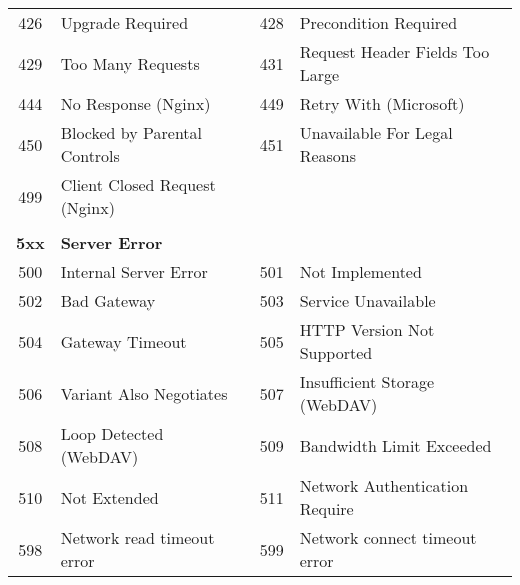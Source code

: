 \begin{longtable}[\textwidth]{|c|l|c|l|}
	426 & Upgrade Required & 428 & Precondition Required \\
	429 & Too Many Requests & 431 & Request Header Fields Too Large \\
	444 & No Response (Nginx) & 449 & Retry With (Microsoft) \\
	450 & Blocked by Parental Controls & 451 & Unavailable For Legal Reasons \\
	499 & Client Closed Request (Nginx) & & \\
	& & & \\
	\textbf{5xx} & \textbf{Server Error} & & \\
	500 & Internal Server Error & 501 & Not Implemented \\
	502 & Bad Gateway & 503 & Service Unavailable \\
	504 & Gateway Timeout & 505 & HTTP Version Not Supported \\
	506 & Variant Also Negotiates & 507 & Insufficient Storage (WebDAV) \\
	508 & Loop Detected (WebDAV) & 509 & Bandwidth Limit Exceeded \\
	510 & Not Extended & 511 & Network Authentication Require \\
	598 & Network read timeout error & 599 & Network connect timeout error \\
\end{longtable}